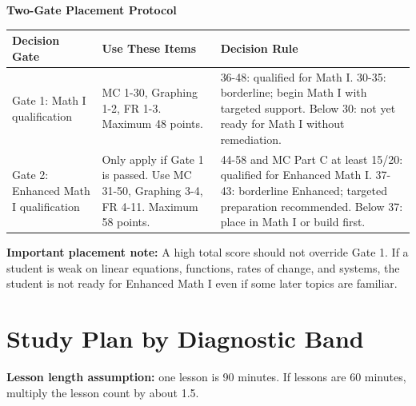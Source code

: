 \documentclass[11pt]{article}
\renewcommand{\arraystretch}{1.18}
\begin{document}
\begin{sectionNote}
\textbf{Two-Gate Placement Protocol}
\end{sectionNote}
\begin{center}
\renewcommand{\arraystretch}{1.25}
\begin{tabular}{|L{3.0cm}|L{4.4cm}|L{6.2cm}|}
\hline
\textbf{Decision Gate} & \textbf{Use These Items} & \textbf{Decision Rule}\\
\hline
Gate 1: Math I qualification & MC 1-30, Graphing 1-2, FR 1-3. Maximum 48 points. & 
36-48: qualified for Math I. 30-35: borderline; begin Math I with targeted support. Below 30: not yet ready for Math I without remediation.\\
\hline
Gate 2: Enhanced Math I qualification & Only apply if Gate 1 is passed. Use MC 31-50, Graphing 3-4, FR 4-11. Maximum 58 points. &
44-58 and MC Part C at least 15/20: qualified for Enhanced Math I. 37-43: borderline Enhanced; targeted preparation recommended. Below 37: place in Math I or build first.\\
\hline
\end{tabular}
\end{center}

\begin{titlebox}
\textbf{Important placement note:} A high total score should not override Gate 1. If a student is weak on linear equations, functions, rates of change, and systems, the student is not ready for Enhanced Math I even if some later topics are familiar.
\end{titlebox}

\newpage
\section*{Study Plan by Diagnostic Band}
\begin{sectionNote}
\textbf{Lesson length assumption:} one lesson is 90 minutes. If lessons are 60 minutes, multiply the lesson count by about 1.5.
\end{sectionNote}
\end{document}
